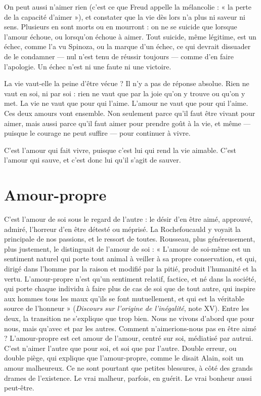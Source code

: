 On peut aussi n’aimer rien (c’est ce que Freud appelle la mélancolie : « la
perte de la capacité d’aimer »), et constater que la vie dès lors n’a plus ni saveur
ni sens. Plusieurs en sont morts ou en mourront : on ne se suicide que lorsque
l'amour échoue, ou lorsqu'on échoue à aimer. Tout suicide, même légitime, est
un échec, comme l’a vu Spinoza, ou la marque d’un échec, ce qui devrait dissuader
de le condamner — nul n’est tenu de réussir toujours — comme d’en faire
l'apologie. Un échec n’est ni une faute ni une victoire.

La vie vaut-elle la peine d’être vécue ? Il n’y a pas de réponse absolue. Rien
ne vaut en soi, ni par soi : rien ne vaut que par la joie qu’on y trouve ou qu’on
y met. La vie ne vaut que pour qui l’aime. L'amour ne vaut que pour qui
l'aime. Ces deux amours vont ensemble. Non seulement parce qu’il faut être
vivant pour aimer, mais aussi parce qu’il faut aimer pour prendre goût à la vie,
et même — puisque le courage ne peut suffire — pour continuer à vivre.

C’est l'amour qui fait vivre, puisque c’est lui qui rend la vie aimable. C’est
l'amour qui sauve, et c’est donc lui qu’il s’agit de sauver.

\section{Amour-propre}
C'est l’amour de soi sous le regard de l’autre : le désir d’en
être aimé, approuvé, admiré, l’horreur d’en être détesté
ou méprisé. La Rochefoucauld y voyait la principale de nos passions, et le ressort
de toutes. Rousseau, plus généreusement, plus justement, le distinguait de
l'amour de soi : « L'amour de soi-même est un sentiment naturel qui porte tout
animal à veiller à sa propre conservation, et qui, dirigé dans l’homme par la
raison et modifié par la pitié, produit l'humanité et la vertu. L’amour-propre
n’est qu’un sentiment relatif, factice, et né dans la société, qui porte chaque
individu à faire plus de cas de soi que de tout autre, qui inspire aux hommes
tous les maux qu’ils se font mutuellement, et qui est la véritable source de
l’honneur » ({\it Discours sur l'origine de l'inégalité}, note XV). Entre les deux, la
transition ne s’explique que trop bien. Nous ne vivons d’abord que pour nous,
mais qu'avec et par les autres. Comment n’aimerions-nous pas en être aimé ?
L’amour-propre est cet amour de l’amour, centré sur soi, médiatisé par autrui.
C’est n’aimer l’autre que pour soi, et soi que par l’autre. Double erreur, ou
double piège, qui explique que l’amour-propre, comme le disait Alain, soit un
amour malheureux. Ce ne sont pourtant que petites blessures, à côté des grands
drames de l'existence. Le vrai malheur, parfois, en guérit. Le vrai bonheur aussi
peut-être.

